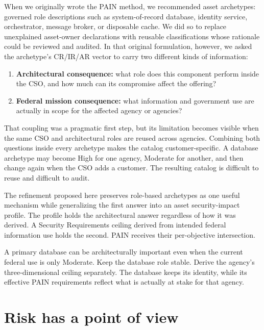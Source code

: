 \documentclass[11pt]{article}
\begin{document}
When we originally wrote the PAIN method, we recommended asset archetypes:
governed role descriptions such as system-of-record database, identity service,
orchestrator, message broker, or disposable cache. We did so to replace unexplained
asset-owner declarations with reusable classifications whose rationale could be
reviewed and audited. In that original formulation, however, we asked the
archetype's CR/IR/AR vector to carry two different kinds of information:

\begin{enumerate}[leftmargin=1.7em]
\item \textbf{Architectural consequence:} what role does this component perform
  inside the CSO, and how much can its compromise affect the offering?
\item \textbf{Federal mission consequence:} what information and government use
  are actually in scope for the affected agency or agencies?
\end{enumerate}

That coupling was a pragmatic first step, but its limitation becomes visible when
the same CSO and architectural roles are reused across agencies. Combining both
questions inside every archetype makes the catalog customer-specific. A database
archetype may become High for one agency, Moderate for another, and then change
again when the CSO adds a customer. The resulting catalog is difficult to reuse
and difficult to audit.

The refinement proposed here preserves role-based archetypes as one useful
mechanism while generalizing the first answer into an asset security-impact
profile. The profile holds the architectural answer regardless of how it was
derived. A Security Requirements ceiling derived from intended federal information
use holds the second. PAIN receives their per-objective intersection.

\begin{plain}
A primary database can be architecturally important even when the current federal
use is only Moderate. Keep the database role stable. Derive the agency's
three-dimensional ceiling separately. The database keeps its identity, while its
effective PAIN requirements reflect what is actually at stake for that agency.
\end{plain}

\section{Risk has a point of view}
\end{document}

